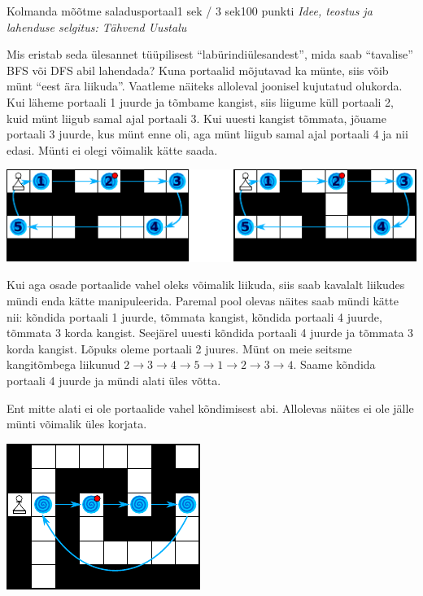 \begin{yl}{5}{Kolmanda mõõtme saladus}{portaal}{1 sek / 3 sek}{100 punkti}
  \emph{Idee, teostus ja lahenduse selgitus: Tähvend Uustalu}

  Mis eristab seda ülesannet tüüpilisest ``labürindiülesandest'', mida saab
  ``tavalise'' BFS või DFS abil lahendada? Kuna portaalid
  mõjutavad ka münte, siis võib münt ``eest ära liikuda''. Vaatleme näiteks alloleval
  joonisel kujutatud olukorda. Kui läheme portaali 1 juurde ja tõmbame kangist,
  siis liigume küll portaali 2, kuid münt liigub samal ajal portaali 3. Kui
  uuesti kangist tõmmata, jõuame portaali 3 juurde, kus münt enne oli, aga münt
  liigub samal ajal portaali 4 ja nii edasi. Münti ei olegi võimalik kätte saada.

  \begin{center}
    \includegraphics[scale=1.5]{example1}
  \end{center}

  Kui aga osade portaalide vahel oleks võimalik liikuda, siis saab kavalalt liikudes
  mündi enda kätte manipuleerida. Paremal pool olevas näites saab mündi kätte nii:
  kõndida portaali 1 juurde, tõmmata kangist, kõndida portaali 4 juurde, tõmmata 3
  korda kangist. Seejärel uuesti kõndida portaali 4 juurde ja tõmmata 3 korda kangist.
  Lõpuks oleme portaali 2 juures. Münt on meie seitsme kangitõmbega liikunud
  $2 \to 3 \to 4 \to 5 \to 1 \to 2 \to 3 \to 4$. Saame kõndida portaali 4 juurde
  ja mündi alati üles võtta.

  Ent mitte alati ei ole portaalide vahel kõndimisest abi. Allolevas näites
  ei ole jälle münti võimalik üles korjata.

  \begin{center}
    \includegraphics[scale=1.5]{example2}
  \end{center}


\end{yl}
